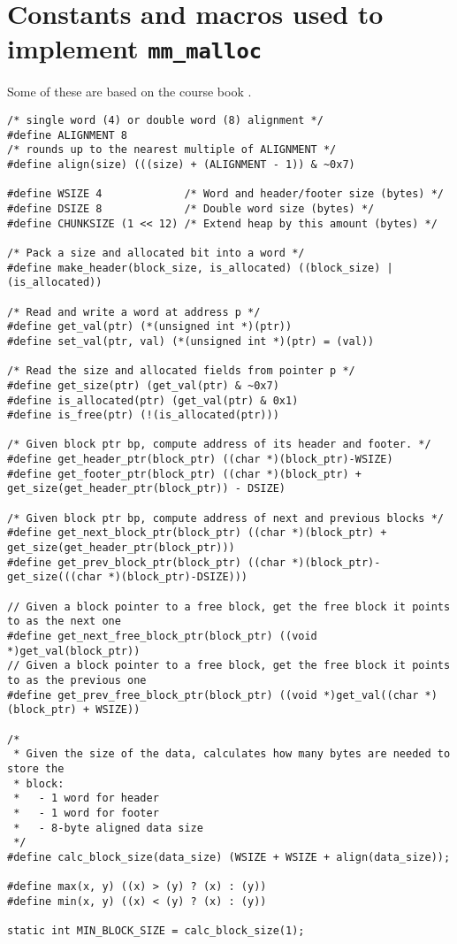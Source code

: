 \section{Constants and macros used to implement \texttt{mm\_malloc}}
\label{app:malloc-macros}

Some of these are based on the course book \cite[p. 893]{computersystems}.

\bgroup
\small
\begin{verbatim}
/* single word (4) or double word (8) alignment */
#define ALIGNMENT 8
/* rounds up to the nearest multiple of ALIGNMENT */
#define align(size) (((size) + (ALIGNMENT - 1)) & ~0x7)

#define WSIZE 4             /* Word and header/footer size (bytes) */
#define DSIZE 8             /* Double word size (bytes) */
#define CHUNKSIZE (1 << 12) /* Extend heap by this amount (bytes) */

/* Pack a size and allocated bit into a word */
#define make_header(block_size, is_allocated) ((block_size) | (is_allocated))

/* Read and write a word at address p */
#define get_val(ptr) (*(unsigned int *)(ptr))
#define set_val(ptr, val) (*(unsigned int *)(ptr) = (val))

/* Read the size and allocated fields from pointer p */
#define get_size(ptr) (get_val(ptr) & ~0x7)
#define is_allocated(ptr) (get_val(ptr) & 0x1)
#define is_free(ptr) (!(is_allocated(ptr)))

/* Given block ptr bp, compute address of its header and footer. */
#define get_header_ptr(block_ptr) ((char *)(block_ptr)-WSIZE)
#define get_footer_ptr(block_ptr) ((char *)(block_ptr) + get_size(get_header_ptr(block_ptr)) - DSIZE)

/* Given block ptr bp, compute address of next and previous blocks */
#define get_next_block_ptr(block_ptr) ((char *)(block_ptr) + get_size(get_header_ptr(block_ptr)))
#define get_prev_block_ptr(block_ptr) ((char *)(block_ptr)-get_size(((char *)(block_ptr)-DSIZE)))

// Given a block pointer to a free block, get the free block it points to as the next one
#define get_next_free_block_ptr(block_ptr) ((void *)get_val(block_ptr))
// Given a block pointer to a free block, get the free block it points to as the previous one
#define get_prev_free_block_ptr(block_ptr) ((void *)get_val((char *)(block_ptr) + WSIZE))

/*
 * Given the size of the data, calculates how many bytes are needed to store the
 * block:
 *   - 1 word for header
 *   - 1 word for footer
 *   - 8-byte aligned data size
 */
#define calc_block_size(data_size) (WSIZE + WSIZE + align(data_size));

#define max(x, y) ((x) > (y) ? (x) : (y))
#define min(x, y) ((x) < (y) ? (x) : (y))

static int MIN_BLOCK_SIZE = calc_block_size(1);
\end{verbatim}
\egroup
